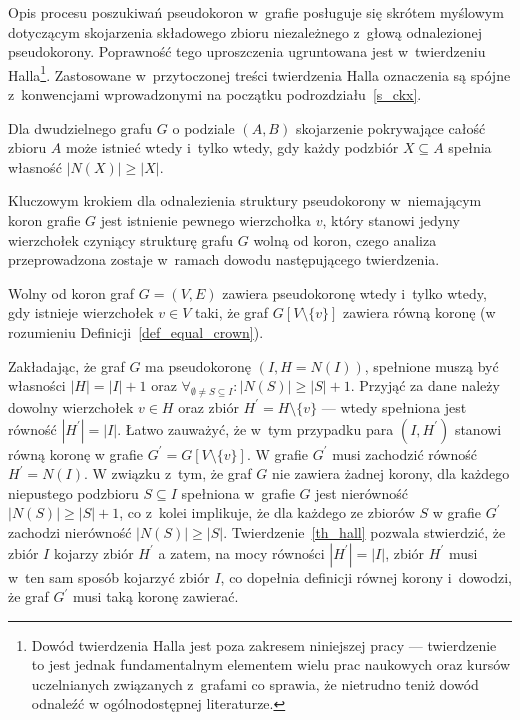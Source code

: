 \par{
  Opis procesu poszukiwań pseudokoron w~grafie posługuje się skrótem myślowym dotyczącym skojarzenia składowego zbioru niezależnego z~głową odnalezionej pseudokorony. 
  Poprawność tego uproszczenia ugruntowana jest w~twierdzeniu Halla\footnote{Dowód twierdzenia Halla jest poza zakresem niniejszej pracy --- twierdzenie to jest jednak fundamentalnym elementem wielu prac naukowych oraz kursów uczelnianych związanych z~grafami co sprawia, że nietrudno teniż dowód odnaleźć w ogólnodostępnej literaturze.}.
  Zastosowane w~przytoczonej treści twierdzenia Halla oznaczenia są spójne z~konwencjami wprowadzonymi na początku podrozdziału~\ref{s_ckx}.
  \begin{theorem}
    Dla dwudzielnego grafu $G$ o podziale $(A, B)$ skojarzenie pokrywające całość zbioru $A$ może istnieć wtedy i~tylko wtedy, gdy każdy podzbiór $X \subseteq A$ spełnia własność $|N(X)| \geq |X|$.
  \end{theorem}
  Kluczowym krokiem dla odnalezienia struktury pseudokorony w~niemającym koron grafie $G$ jest istnienie pewnego wierzchołka $v$, który stanowi jedyny wierzchołek czyniący strukturę grafu $G$ wolną od koron, czego analiza przeprowadzona zostaje w~ramach dowodu następującego twierdzenia.
  \begin{theorem}
    Wolny od koron graf $G=(V, E)$ zawiera pseudokoronę wtedy i~tylko wtedy, gdy istnieje wierzchołek $v \in V$ taki, że graf $G[V\setminus \{v\}]$ zawiera równą koronę (w rozumieniu Definicji~\ref{def_equal_crown}).
  \end{theorem}
  \begin{bproof}
    Zakładając, że graf $G$ ma pseudokoronę $(I, H=N(I))$, spełnione muszą być własności $|H| = |I| + 1$ oraz $\forall_{\emptyset\neq S \subseteq I}:{|N(S)|\geq|S|+1}$.
    Przyjąć za dane należy dowolny wierzchołek $v \in H$ oraz zbiór $H^\prime=H \setminus \{v\}$ --- wtedy spełniona jest równość $|H^\prime|=|I|$.
    Łatwo zauważyć, że w~tym przypadku para $(I, H^\prime)$ stanowi równą koronę w grafie $G^\prime = G[V \setminus \{v\}]$.
    W grafie $G^\prime$ musi zachodzić równość $H^\prime = N(I)$.
    W związku z~tym, że graf $G$ nie zawiera żadnej korony, dla każdego niepustego podzbioru $S \subseteq I$ spełniona w~grafie $G$ jest nierówność $|N(S)| \geq |S|+1$, co z~kolei implikuje, że dla każdego ze zbiorów $S$ w grafie $G^\prime$ zachodzi nierówność $|N(S)| \geq |S|$.
    Twierdzenie~\ref{th_hall} pozwala stwierdzić, że zbiór $I$ kojarzy zbiór $H^\prime$ a zatem, na mocy równości $|H^\prime|=|I|$, zbiór $H^\prime$ musi w~ten sam sposób kojarzyć zbiór $I$, co dopełnia definicji równej korony i~dowodzi, że graf $G^\prime$ musi taką koronę zawierać.


\end{bproof}}
